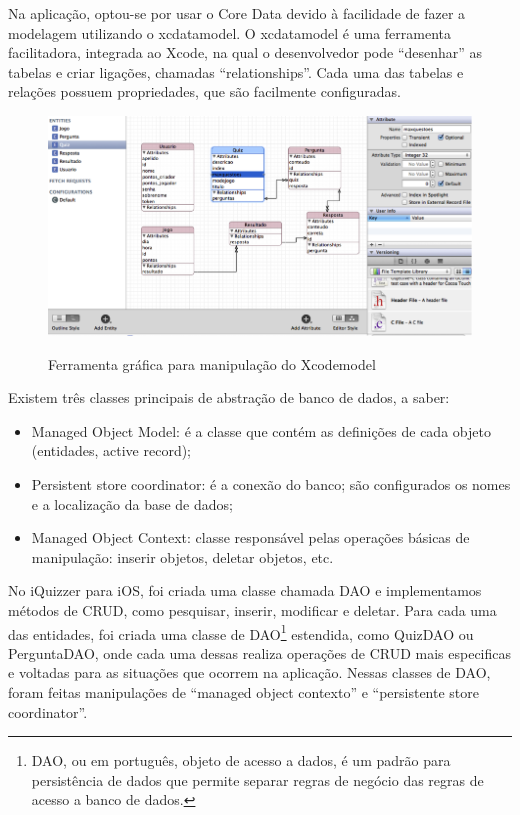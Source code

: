 		    Na aplicação, optou-se por usar o Core Data devido à facilidade de fazer a modelagem utilizando o xcdatamodel. O xcdatamodel é uma ferramenta facilitadora, integrada ao Xcode, na qual o desenvolvedor pode ``desenhar'' as tabelas e criar ligações, chamadas ``relationships''. Cada uma das tabelas e relações possuem propriedades, que são facilmente configuradas.
     
	 \begin{figure}[H]
	   \centering
	   \includegraphics{figs/iosmanaged.png}\\
	   \caption{ Ferramenta gráfica para manipulação do Xcodemodel }
	   \label{FIG:iosmanaged}
	 \end{figure}
     
            Existem três classes principais de abstração de banco de dados, a saber:
\begin{itemize}
\item Managed Object Model: é a classe que contém as definições de cada objeto (entidades, active record);
\item Persistent store coordinator: é a conexão do banco; são configurados os nomes e a localização da base de dados;
\item Managed Object Context: classe responsável pelas operações básicas de manipulação: inserir objetos, deletar objetos, etc.
\end{itemize}
   
    No iQuizzer para iOS, foi criada uma classe chamada DAO e implementamos métodos de \ac{CRUD}, como pesquisar, inserir, modificar e deletar. Para cada uma das entidades, foi criada uma classe de \ac{DAO}\footnote{DAO, ou em português, objeto de acesso a dados, é um padrão para persistência de dados que permite separar regras de negócio das regras de acesso a banco de dados.} estendida, como QuizDAO ou PerguntaDAO, onde cada uma dessas realiza operações de \ac{CRUD} mais especificas e voltadas para as situações que ocorrem na aplicação. Nessas classes de \ac{DAO}, foram feitas manipulações de ``managed object contexto'' e ``persistente store coordinator''.
            

